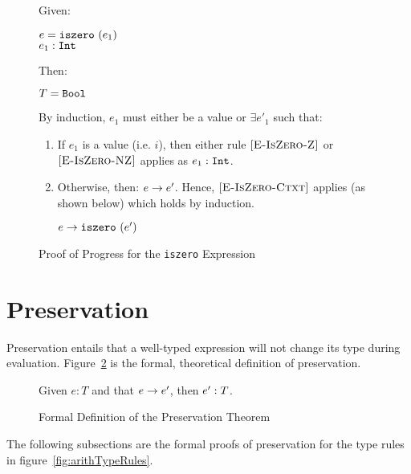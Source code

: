 \documentclass{report}
\newcommand{\rel}[1]{ \mbox{\sc [#1]} }
\begin{document}
\begin{figure}[ht!]
Given:
\begin{center}
  $e = \mbox{\tt iszero}~(e_1)$ \\
  ${e_1} : {\mbox{\tt Int}}$
\end{center}
Then:~\\
\begin{center}
   $T = \mbox{\tt Bool}$
\end{center}

By induction, $e_1$ must either be a value or $\exists e'_1$ such that:~\\

	\begin{enumerate}
    \item If $e_1$ is a value (i.e. $i$), then either rule $\rel{E-IsZero-Z}$ or $\rel{E-IsZero-NZ}$ applies as ${e_1} : {\mbox{\tt Int}}$.
      
    \item Otherwise, then: ${e} \rightarrow {e'}$.  Hence, $\rel{E-IsZero-Ctxt}$ applies (as shown below) which holds by induction.
    
    \begin{center}
      ${e} \rightarrow {\mbox{\tt iszero}~(e')}$
    \end{center}
	
	\end{enumerate}
	
  \caption{Proof of Progress for the \texttt{iszero} Expression}\label{fig:isZeroProofProgress}
\end{figure}

\eject
\section{Preservation}\label{sec:preservation}

Preservation entails that a well-typed expression will not change its type during evaluation.  Figure~\ref{fig:preservationTheorem} is the formal, theoretical definition of preservation.

\begin{figure}[H]

	Given $e : T$ and that ${e} \rightarrow {e'}$, then ${e'} : {T}$.
	
  \caption{Formal Definition of the Preservation Theorem}\label{fig:preservationTheorem}
\end{figure}

The following subsections are the formal proofs of preservation for the type rules in figure~\ref{fig:arithTypeRules}. 
\end{document}
